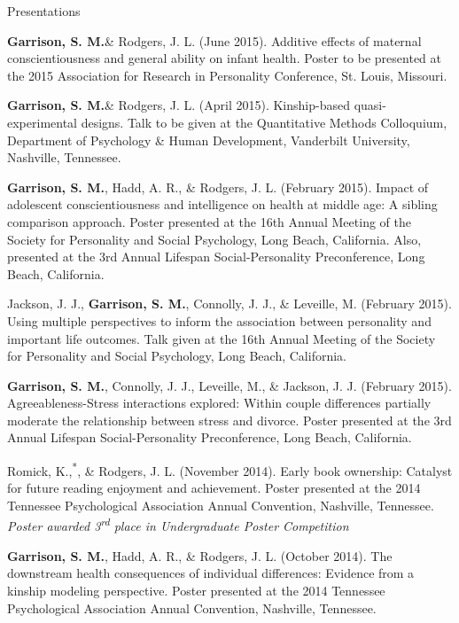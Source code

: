 \documentclass {resume}
\newcommand{\meb}{{\bf Garrison, S. M.}\xspace}
\newcommand{\student}{\hspace{-3.95pt}\textsuperscript{*}\hspace* {2 pt}}
\newlength{\wideitemsep}
\let\olditem\item
\renewcommand{\item}{\setlength{\itemsep}{\wideitemsep}\olditem}
\begin{document}
\begin{rSection}{\textrm{Presentations}}\begin{etaremune}
\item \meb \& Rodgers, J. L. (June 2015). Additive effects of maternal conscientiousness and general ability on infant health. Poster to be presented at the 2015 Association for Research in Personality Conference, St. Louis, Missouri.%
\item\meb \& Rodgers, J. L. (April 2015). Kinship-based quasi-experimental designs. Talk to be given at the Quantitative Methods Colloquium, Department of Psychology \& Human Development, Vanderbilt University, Nashville, Tennessee.
\item \meb, Hadd, A. R., \& Rodgers, J. L. (February 2015). Impact of adolescent conscientiousness and intelligence on health at middle age: A sibling comparison approach. Poster presented at the 16th Annual Meeting of the Society for Personality and  Social Psychology, Long Beach, California. Also, presented at the 3rd Annual Lifespan Social-Personality Preconference, Long Beach, California.
\item Jackson, J. J., \textbf{Garrison, S. M.}, Connolly, J. J., \& Leveille, M. (February 2015). Using multiple perspectives to inform the association between personality and important life outcomes. Talk given at the 16th Annual Meeting of the Society for Personality and  Social Psychology, Long Beach, California.
\item\meb, Connolly, J. J., Leveille, M., \& Jackson, J. J. (February 2015). Agreeableness-Stress interactions explored: Within couple differences partially moderate the relationship between stress and divorce. Poster presented at the 3rd Annual Lifespan Social-Personality Preconference, Long Beach, California.
\item Romick, K.,\student \meb, \& Rodgers, J. L. (November 2014). Early book ownership: Catalyst for future reading enjoyment and achievement. Poster presented at the 2014 Tennessee Psychological Association Annual Convention, Nashville, Tennessee. \textit{Poster awarded 3\textsuperscript{rd} place in Undergraduate Poster Competition}
\item\meb, Hadd, A. R., \& Rodgers, J. L. (October 2014). The downstream health consequences of individual differences: Evidence from a kinship modeling perspective. Poster presented at the 2014 Tennessee Psychological Association Annual Convention, Nashville, Tennessee.

\end{etaremune}
\end{rSection}
\end{document}

